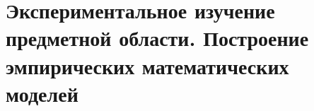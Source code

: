 \documentclass[../nirs.tex]{subfiles}
\begin{document}
\section{Экспериментальное изучение предметной области. Построение эмпирических
математических моделей}
	
\end{document}

